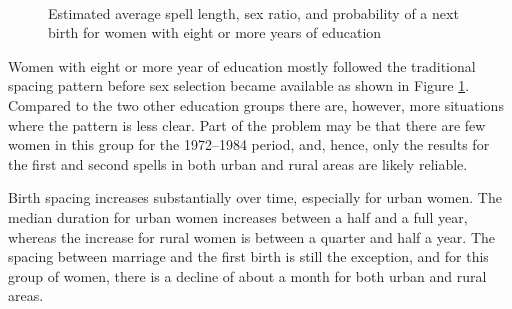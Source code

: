 \documentclass[12pt,letterpaper]{article}
\begin{document}
\begin{figure}[htpb]
\centering
{}
\\
\caption{Estimated average spell length, sex ratio, and probability of 
a next birth for women with eight or more years of education}
\label{fig:bootstrap_high}
\end{figure}




Women with eight or more year of education mostly followed 
the traditional spacing pattern before sex selection became 
available as shown in Figure \ref{fig:bootstrap_high}.
Compared to the two other education groups there are,
however, more situations where the pattern is less clear.
Part of the problem may be that there are few women in
this group for the 1972--1984 period, and, hence, only 
the results for the first and second spells in both urban 
and rural areas are likely reliable.


Birth spacing increases substantially over time, 
especially for urban women. 
The median duration for urban women increases between a half
and a full year, whereas the increase for rural women 
is between a quarter and half a year.
The spacing between marriage and the first birth is still the
exception, and for this group of women, there is a decline of
about a month for both urban and rural areas.
\end{document}
